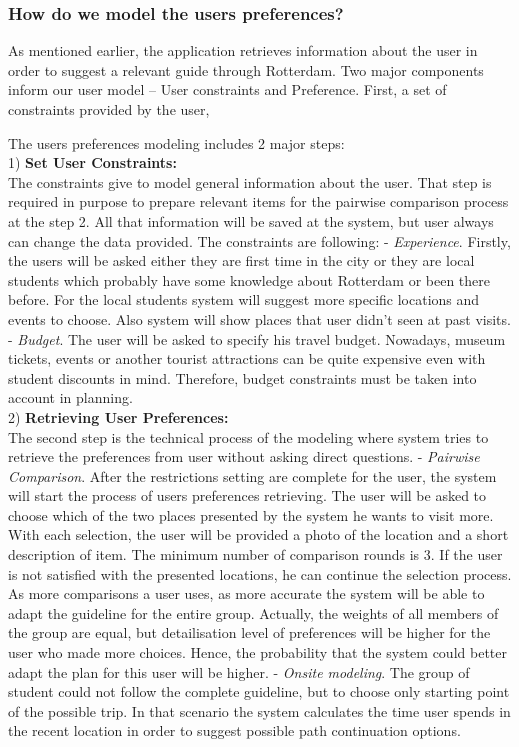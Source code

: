 \documentclass[11pt,a4paper,oneside]{article}
\begin{document}
\subsubsection{How do we model the users preferences?}
As mentioned earlier, the application retrieves information about the user in order to suggest a relevant guide through Rotterdam. Two major components inform our user model -- User constraints and Preference. First, a set of constraints provided by the user,


The users preferences modeling includes 2 major steps: \\	1) \textbf{Set User Constraints:}\\	
The constraints give to model general information about the user. That step is required in purpose to prepare relevant items for the pairwise comparison process at the step 2. All that information will be saved at the system, but user always can change the data provided. The constraints are following:\newline 
	- \textit{Experience}. Firstly, the users will be asked either they are first time in the city or they are local students which probably have some knowledge about Rotterdam or been there before. For the local students system will suggest more specific locations and events to choose. Also system will show places that user didn’t seen at past visits. \\
    - \textit{Budget}. The user will be asked to specify his travel budget. Nowadays, museum tickets, events or another tourist attractions can be quite expensive even with student discounts in mind. Therefore, budget constraints must be taken into account in planning.\\
  2) \textbf{Retrieving User Preferences:}\\
  The second step is the technical process of the modeling where system tries to retrieve the preferences from user without asking direct questions.\newline  
- \textit{Pairwise Comparison}. After the restrictions setting are complete for the user, the system will start the process of users preferences retrieving. The user will be asked to choose which of the two places presented by the system he wants to visit more. With each selection, the user will be provided a photo of the location and a short description of item. The minimum number of comparison rounds is 3. If the user is not satisfied with the presented locations, he can continue the selection process. As more comparisons a user uses, as more accurate the system will be able to adapt the guideline for the entire group. Actually, the weights of all members of the group are equal, but detailisation level of preferences will be higher for the user who made more choices. Hence, the probability that the system could better adapt the plan for this user will be higher.\newline
- \textit{Onsite modeling}. The group of student could not follow the complete guideline, but to choose only starting point of the possible trip. In that scenario the system calculates the time user spends in the recent location in order to suggest possible path continuation options.    
\end{document}
